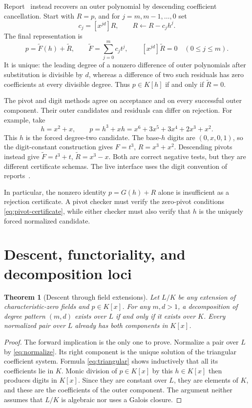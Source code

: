 \documentclass[11pt,a4paper]{article}
\numberwithin{equation}{section}
\newtheorem{theorem}{Theorem}[section]
\theoremstyle{definition}
\theoremstyle{remark}
\begin{document}
Report~\cite{r2} instead recovers an outer polynomial by descending coefficient
cancellation.  Start with \(R=p\), and for \(j=m,m-1,\ldots,0\) set
\[
 c_j=[x^{jd}]R,\qquad R\leftarrow R-c_jh^j.
\]
The final representation is
\begin{equation}\label{eq:pivot-certificate}
 p=\widetilde F(h)+\widetilde R,\qquad
 \widetilde F=\sum_{j=0}^m c_jt^j,\qquad
 [x^{jd}]\widetilde R=0\quad(0\le j\le m).
\end{equation}
It is unique: the leading degree of a nonzero difference of outer polynomials
after substitution is divisible by \(d\), whereas a difference of two such
residuals has zero coefficients at every divisible degree.  Thus
\(p\in K[h]\) if and only if \(\widetilde R=0\).

The pivot and digit methods agree on acceptance and on every successful
outer component.  Their outer candidates and residuals can differ on rejection.
For example, take
\[
 h=x^2+x,\qquad
 p=h^3+xh=x^6+3x^5+3x^4+2x^3+x^2.
\]
This \(h\) is the forced degree-two candidate.  The base-\(h\) digits
are \((0,x,0,1)\), so the digit-constant construction gives
\(F=t^3\), \(R=x^3+x^2\).  Descending pivots instead give
\(\widetilde F=t^3+t\), \(\widetilde R=x^3-x\).
Both are correct negative tests, but they are different certificate schemas.
The live interface uses the digit convention of reports~\cite{r1,r3}.

In particular, the nonzero identity
\(p=G(h)+R\) alone is insufficient as a rejection certificate.
A pivot checker must verify the zero-pivot conditions
\eqref{eq:pivot-certificate}, while either checker must also verify that
\(h\) is the uniquely forced normalized candidate.

\section{Descent, functoriality, and decomposition loci}
\label{sec:descent}
\begin{theorem}[Descent through field extensions]
\label{thm:descent}
Let $L/K$ be any extension of characteristic-zero fields and $p\in K[x]$.
For any $m,d>1$, a decomposition of degree pattern $(m,d)$ exists over $L$
if and only if it exists over $K$. Every normalized pair over $L$ already
has both components in $K[x]$.
\end{theorem}
\begin{proof}
The forward implication is the only one to prove. Normalize a pair over $L$
by \eqref{eq:normalize}. Its right component is the unique solution of the
triangular coefficient system. Formula \eqref{eq:triangular} shows inductively
that all its coefficients lie in $K$. Monic division of $p\in K[x]$ by this
$h\in K[x]$ then produces digits in $K[x]$. Since they are constant over $L$,
they are elements of $K$, and these are the coefficients of the outer
component. The argument neither assumes that $L/K$ is algebraic nor uses a
Galois closure.
\end{proof}
\end{document}
